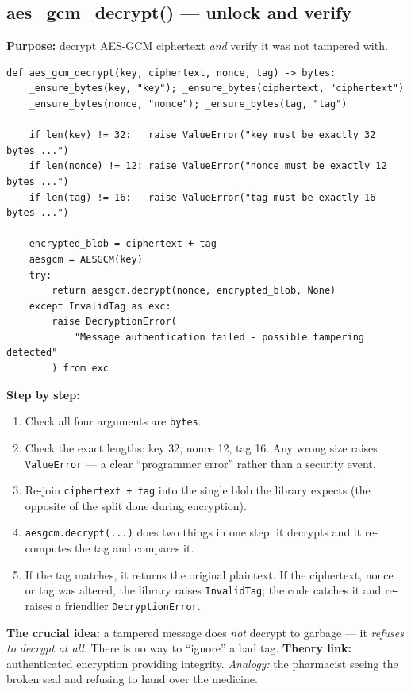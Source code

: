 \documentclass[11pt,a4paper]{report}
\begin{document}
\subsection{aes\_gcm\_decrypt() --- unlock and verify}
\textbf{Purpose:} decrypt AES-GCM ciphertext \emph{and} verify it was not
tampered with.
\begin{lstlisting}[style=py,caption={crypto.py --- AES-256-GCM decryption with tamper detection.}]
def aes_gcm_decrypt(key, ciphertext, nonce, tag) -> bytes:
    _ensure_bytes(key, "key"); _ensure_bytes(ciphertext, "ciphertext")
    _ensure_bytes(nonce, "nonce"); _ensure_bytes(tag, "tag")

    if len(key) != 32:   raise ValueError("key must be exactly 32 bytes ...")
    if len(nonce) != 12: raise ValueError("nonce must be exactly 12 bytes ...")
    if len(tag) != 16:   raise ValueError("tag must be exactly 16 bytes ...")

    encrypted_blob = ciphertext + tag
    aesgcm = AESGCM(key)
    try:
        return aesgcm.decrypt(nonce, encrypted_blob, None)
    except InvalidTag as exc:
        raise DecryptionError(
            "Message authentication failed - possible tampering detected"
        ) from exc
\end{lstlisting}
\textbf{Step by step:}
\begin{enumerate}
  \item Check all four arguments are \texttt{bytes}.
  \item Check the exact lengths: key 32, nonce 12, tag 16. Any wrong size raises
        \texttt{ValueError} --- a clear ``programmer error'' rather than a
        security event.
  \item Re-join \texttt{ciphertext + tag} into the single blob the library
        expects (the opposite of the split done during encryption).
  \item \texttt{aesgcm.decrypt(...)} does two things in one step: it decrypts and
        it re-computes the tag and compares it.
  \item If the tag matches, it returns the original plaintext. If the ciphertext,
        nonce or tag was altered, the library raises \texttt{InvalidTag}; the
        code catches it and re-raises a friendlier \texttt{DecryptionError}.
\end{enumerate}
\textbf{The crucial idea:} a tampered message does \emph{not} decrypt to garbage
--- it \emph{refuses to decrypt at all}. There is no way to ``ignore'' a bad tag.
\textbf{Theory link:} authenticated encryption providing integrity.
\emph{Analogy:} the pharmacist seeing the broken seal and refusing to hand over
the medicine.
\end{document}
